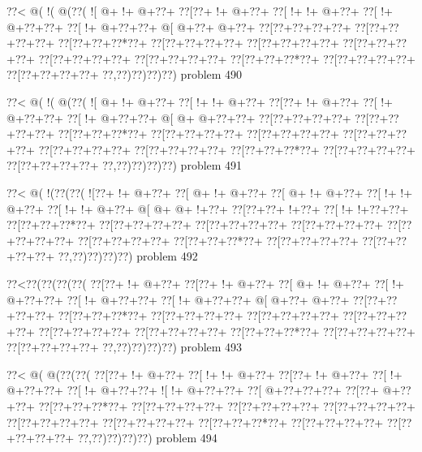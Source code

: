 \vbox{\vbox{\goo
\0??<\- @(\- !(\- @(\0??(
\- ![\- @+\- !+\- @+\0??+
\0??[\0??+\- !+\- @+\0??+
\0??[\- !+\- !+\- @+\0??+
\0??[\- !+\- @+\0??+\0??+
\0??[\- !+\- @+\0??+\0??+
\- @[\- @+\0??+\- @+\0??+
\0??[\0??+\0??+\0??+\0??+
\0??[\0??+\0??+\0??+\0??+
\0??[\0??+\0??+\0??*\0??+
\0??[\0??+\0??+\0??+\0??+
\0??[\0??+\0??+\0??+\0??+
\0??[\0??+\0??+\0??+\0??+
\0??[\0??+\0??+\0??+\0??+
\0??[\0??+\0??+\0??+\0??+
\0??[\0??+\0??+\0??*\0??+
\0??[\0??+\0??+\0??+\0??+
\0??[\0??+\0??+\0??+\0??+
\0??,\0??)\0??)\0??)\0??)
}
\hfil problem 490\hfil\break
}

\vbox{\vbox{\goo
\0??<\- @(\- !(\- @(\0??(
\- ![\- @+\- !+\- @+\0??+
\0??[\- !+\- !+\- @+\0??+
\0??[\0??+\- !+\- @+\0??+
\0??[\- !+\- @+\0??+\0??+
\0??[\- !+\- @+\0??+\0??+
\- @[\- @+\- @+\0??+\0??+
\0??[\0??+\0??+\0??+\0??+
\0??[\0??+\0??+\0??+\0??+
\0??[\0??+\0??+\0??*\0??+
\0??[\0??+\0??+\0??+\0??+
\0??[\0??+\0??+\0??+\0??+
\0??[\0??+\0??+\0??+\0??+
\0??[\0??+\0??+\0??+\0??+
\0??[\0??+\0??+\0??+\0??+
\0??[\0??+\0??+\0??*\0??+
\0??[\0??+\0??+\0??+\0??+
\0??[\0??+\0??+\0??+\0??+
\0??,\0??)\0??)\0??)\0??)
}
\hfil problem 491\hfil\break
}

\vbox{\vbox{\goo
\0??<\- @(\- !(\0??(\0??(
\- ![\0??+\- !+\- @+\0??+
\0??[\- @+\- !+\- @+\0??+
\0??[\- @+\- !+\- @+\0??+
\0??[\- !+\- !+\- @+\0??+
\0??[\- !+\- !+\- @+\0??+
\- @[\- @+\- @+\- !+\0??+
\0??[\0??+\0??+\- !+\0??+
\0??[\- !+\- !+\0??+\0??+
\0??[\0??+\0??+\0??*\0??+
\0??[\0??+\0??+\0??+\0??+
\0??[\0??+\0??+\0??+\0??+
\0??[\0??+\0??+\0??+\0??+
\0??[\0??+\0??+\0??+\0??+
\0??[\0??+\0??+\0??+\0??+
\0??[\0??+\0??+\0??*\0??+
\0??[\0??+\0??+\0??+\0??+
\0??[\0??+\0??+\0??+\0??+
\0??,\0??)\0??)\0??)\0??)
}
\hfil problem 492\hfil\break
}

\vbox{\vbox{\goo
\0??<\0??(\0??(\0??(\0??(
\0??[\0??+\- !+\- @+\0??+
\0??[\0??+\- !+\- @+\0??+
\0??[\- @+\- !+\- @+\0??+
\0??[\- !+\- @+\0??+\0??+
\0??[\- !+\- @+\0??+\0??+
\0??[\- !+\- @+\0??+\0??+
\- @[\- @+\0??+\- @+\0??+
\0??[\0??+\0??+\0??+\0??+
\0??[\0??+\0??+\0??*\0??+
\0??[\0??+\0??+\0??+\0??+
\0??[\0??+\0??+\0??+\0??+
\0??[\0??+\0??+\0??+\0??+
\0??[\0??+\0??+\0??+\0??+
\0??[\0??+\0??+\0??+\0??+
\0??[\0??+\0??+\0??*\0??+
\0??[\0??+\0??+\0??+\0??+
\0??[\0??+\0??+\0??+\0??+
\0??,\0??)\0??)\0??)\0??)
}
\hfil problem 493\hfil\break
}

\vbox{\vbox{\goo
\0??<\- @(\- @(\0??(\0??(
\0??[\0??+\- !+\- @+\0??+
\0??[\- !+\- !+\- @+\0??+
\0??[\0??+\- !+\- @+\0??+
\0??[\- !+\- @+\0??+\0??+
\0??[\- !+\- @+\0??+\0??+
\- ![\- !+\- @+\0??+\0??+
\0??[\- @+\0??+\0??+\0??+
\0??[\0??+\- @+\0??+\0??+
\0??[\0??+\0??+\0??*\0??+
\0??[\0??+\0??+\0??+\0??+
\0??[\0??+\0??+\0??+\0??+
\0??[\0??+\0??+\0??+\0??+
\0??[\0??+\0??+\0??+\0??+
\0??[\0??+\0??+\0??+\0??+
\0??[\0??+\0??+\0??*\0??+
\0??[\0??+\0??+\0??+\0??+
\0??[\0??+\0??+\0??+\0??+
\0??,\0??)\0??)\0??)\0??)
}
\hfil problem 494\hfil\break
}

